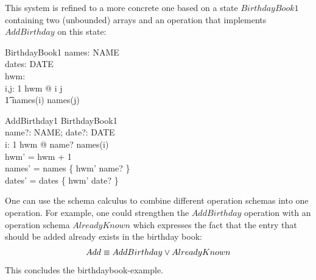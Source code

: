 This system is refined to a more concrete one based on a state $BirthdayBook1$
containing two (unbounded) arrays and an operation that implements $AddBirthday$
on this state:
\begin{zedgroup}
\begin{schema}{BirthdayBook1}
  names: \nat \pfun NAME \\
  dates: \nat \pfun DATE \\
  hwm: \nat \\
  \where
  \forall i,j: 1 \upto hwm @  i \neq j \\
  \t1 \implies names(i) \neq names(j) \\
\end{schema}
\begin{schema}{AddBirthday1}
  \Delta BirthdayBook1 \\
  name?: NAME;  date?: DATE \\
  \where
  \forall i: 1 \upto hwm @ name? \neq names(i) \\
  hwm' = hwm + 1 \\
  names' = names \oplus \{ hwm' \mapsto name? \} \\
  dates' = dates \oplus \{ hwm' \mapsto date? \}
\end{schema}
\end{zedgroup}
One can use the schema calculus to combine different operation schemas into one
operation.  For example, one could strengthen the $AddBirthday$ operation with
an operation schema $AlreadyKnown$ which expresses the fact that the entry that
should be added already exists in the birthday book:
\[
  Add \equiv AddBirthday \lor AlreadyKnown \\
\]
This concludes the birthdaybook-example.

